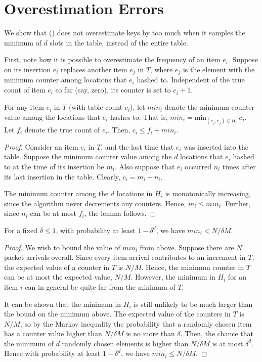 \section{Overestimation Errors}
\label{sec:analysis}

We show that \Baseline () does not overestimate keys by too much
when it samples the minimum of $d$ slots in the table, instead of the entire
table.

First, note how it is possible to overestimate the frequency of an item
$e_i$. Suppose on its insertion $e_i$ replaces another item $e_j$ in $T$, where
$e_j$ is the element with the minimum counter among locations that $e_i$ hashed
to. Independent of the true count of item $e_i$ so far (say, zero), its counter
is set to $c_j + 1$.

\begin{lemma}
For any item $e_i$ in $T$ (with table count $c_i$), let $min_i$ denote the
minimum counter value among the locations that $e_i$ hashes to. That is, $min_i
= \mathrm{min}_{(e_j,c_j) \in H_i} \ c_j$. Let $f_i$ denote the true count of
$e_i$. Then, $c_i \leq f_i + min_i$.
\end{lemma}

\begin{proof}
Consider an item $e_i$ in $T$, and the last time that $e_i$ was inserted into
the table. Suppose the minimum counter value among the $d$ locations that $e_i$
hashed to at the time of its insertion be $m_i$. Also suppose that $e_i$
occurred $n_i$ times after its last insertion in the table. Clearly, $c_i = m_i
+ n_i$.

The minimum counter among the $d$ locations in $H_i$ is monotonically
increasing, since the algorithm never decrements any counters. Hence, $m_i \leq
min_i$. Further, since $n_i$ can be at most $f_i$, the lemma follows.
\end{proof}

\begin{lemma}
For a fixed $\delta \leq 1$, with probability at least $1 - \delta^d$, we have
$min_i < N/\delta M$.
\end{lemma}

\begin{proof}

We wish to bound the value of $min_i$ from above. Suppose there are $N$ packet
arrivals overall. Since every item arrival contributes to an increment in $T$,
the expected value of a counter in $T$ is $N/M.$ Hence, the minimum counter in
$T$ can be at most the expected value, \ie $N/M.$ However, the minimum in $H_i$ for an
item $i$ can in general be quite far from the minimum of $T$.

It can be shown that the minimum in $H_i$ is still unlikely to be much larger
than the bound on the minimum above. The expected value of the counters in $T$
is $N/M$, so by the Markov inequality the probability that a randomly chosen
item has a counter value higher than $N/\delta M$ is no more than
$\delta$. Then, the chance that the minimum of $d$ randomly chosen elements is
higher than $N/\delta M$ is at most $\delta^d$. Hence with probability at least
$1 - \delta^d$, we have $min_i \leq N/\delta M$.

\end{proof}

